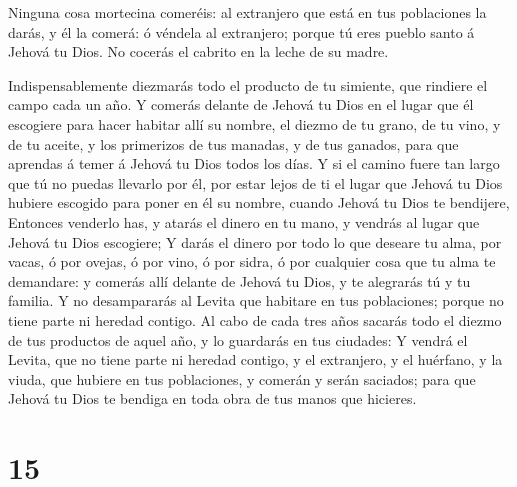  Ninguna cosa mortecina comeréis: al extranjero que está en
tus poblaciones la darás, y él la comerá: ó véndela al extranjero;
porque tú eres pueblo santo á Jehová tu Dios. No cocerás el cabrito en
la leche de su madre.

 Indispensablemente diezmarás todo el producto de tu
simiente, que rindiere el campo cada un año.  Y comerás
delante de Jehová tu Dios en el lugar que él escogiere para hacer
habitar allí su nombre, el diezmo de tu grano, de tu vino, y de tu
aceite, y los primerizos de tus manadas, y de tus ganados, para que
aprendas á temer á Jehová tu Dios todos los días.  Y si el
camino fuere tan largo que tú no puedas llevarlo por él, por estar lejos
de ti el lugar que Jehová tu Dios hubiere escogido para poner en él su
nombre, cuando Jehová tu Dios te bendijere,  Entonces
venderlo has, y atarás el dinero en tu mano, y vendrás al lugar que
Jehová tu Dios escogiere;  Y darás el dinero por todo lo
que deseare tu alma, por vacas, ó por ovejas, ó por vino, ó por sidra, ó
por cualquier cosa que tu alma te demandare: y comerás allí delante de
Jehová tu Dios, y te alegrarás tú y tu familia.  Y no
desampararás al Levita que habitare en tus poblaciones; porque no tiene
parte ni heredad contigo.  Al cabo de cada tres años
sacarás todo el diezmo de tus productos de aquel año, y lo guardarás en
tus ciudades:  Y vendrá el Levita, que no tiene parte ni
heredad contigo, y el extranjero, y el huérfano, y la viuda, que hubiere
en tus poblaciones, y comerán y serán saciados; para que Jehová tu Dios
te bendiga en toda obra de tus manos que hicieres.

\hypertarget{section-14}{%
\section{15}\label{section-14}}

